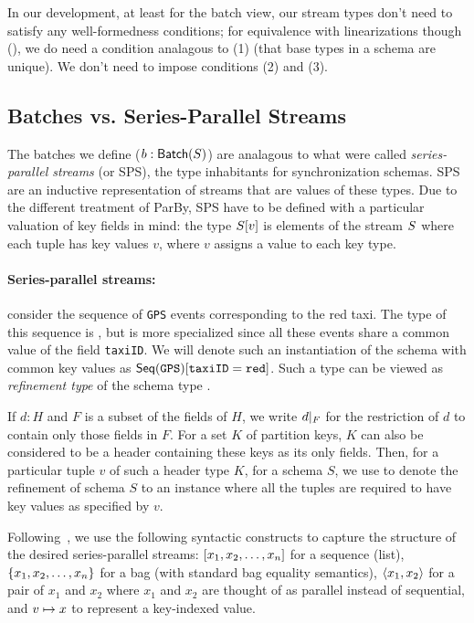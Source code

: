 In our development, at least for the batch view, our stream types don't need to satisfy any well-formedness conditions; for equivalence with linearizations though (), we do need a condition analagous to (1) (that base types in a schema are unique). We don't need to impose conditions (2) and (3).

\subsection{Batches vs. Series-Parallel Streams}

The batches we define ($\batchtype{b}{S}$) are analagous to what were called
\emph{series-parallel streams} (or SPS), the type inhabitants for synchronization schemas.
SPS are an inductive representation of streams that are values of these types.
Due to the different treatment of ParBy,
SPS have to be defined with a particular valuation of key fields in mind: the type $\spstype{v}{\ss}$ is elements of the stream $\ss$ where each tuple has key values $v$, where $v$ assigns a value to each key type.

\paragraph{Series-parallel streams:} consider the sequence of \texttt{GPS} events corresponding
to the red taxi. The type of this sequence is , but is more specialized
since all these events share a common value of the field \texttt{taxiID}.
We will denote such an instantiation of the schema with common key values
as $\spstype{\texttt{taxiID}=\texttt{red}}{\seqleaf{\texttt{GPS}}}$. Such a type can
be viewed as {\em refinement type} of the schema type .

If $d : H$ and $F$ is a subset of the fields of $H$, we write $\tuprestrict{d}{F}$ for
the restriction of $d$ to contain only those fields in $F$.
For a set $K$ of partition keys, $K$ can also be considered to be a header containing these keys as its only fields.
Then, for a particular tuple $v$ of such a header type $K$, for a schema $S$, we use
 to denote the refinement of schema $S$ to an instance where all the tuples
are required to have key values as specified by $v$.

Following~, we use the following syntactic constructs to capture the structure of the desired series-parallel streams: $\spsseq{x_1, x_2, \ldots, x_n}$ for
a sequence (list), $\spsbag{x_1, x_2, \ldots, x_n}$ for a bag (with standard bag
equality semantics), $\spspargen{x_1, x_2}$ for a pair of $x_1$ and $x_2$ where
$x_1$ and $x_2$ are thought of as parallel instead of sequential,
and $\keyed{v}{x}$ to represent a key-indexed value.

